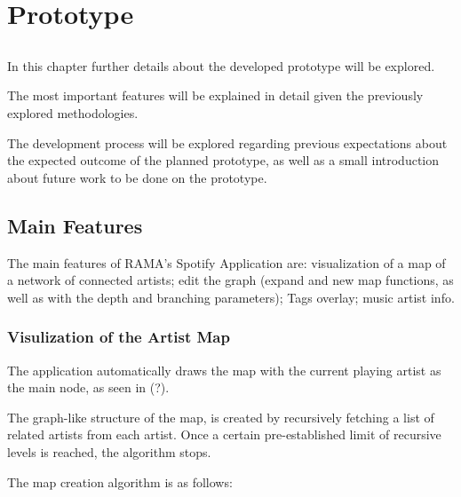 
\chapter{Prototype}
\label{chap:chap4}

\section*{}

In this chapter further details about the developed prototype will be explored.

The most important features will be explained in detail given the previously explored methodologies.

The development process will be explored regarding previous expectations about the expected outcome of the planned prototype, as well as a small introduction about future work to be done on the prototype.




\section{Main Features} %
  \label{sec:main_features}
  
  The main features of RAMA's Spotify Application are: visualization of a map of a network of connected artists; edit the graph (expand and new map functions, as well as with the depth and branching parameters); Tags overlay; music artist info.

  \subsection{Visulization of the Artist Map} %
    \label{sub:visualization}
  
    The application automatically draws the map with the current playing artist as the main node, as seen in (?).

    The graph-like structure of the map, is created by recursively fetching a list of related artists from each artist. Once a certain pre-established limit of recursive levels is reached, the algorithm stops.

    The map creation algorithm is as follows:

    

